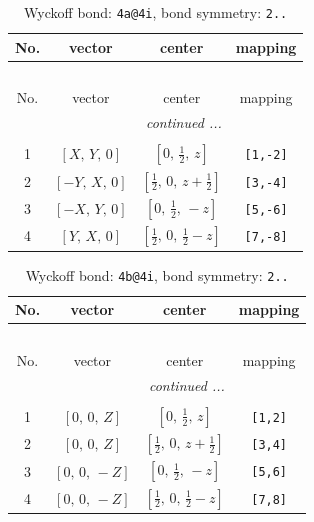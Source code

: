 \documentclass[fleqn,8pt]{jsarticle}
\begin{document}
\begin{longtable}{cccc}
\caption{Wyckoff bond: {\tt 4a@4i}, bond symmetry: {\tt 2..}}
 \\
 \hline \hline
No. & vector & center & mapping \\ \hline \endfirsthead

\multicolumn{3}{l}{\tablename\ \thetable{}} \\
 \hline \hline
No. & vector & center & mapping \\ \hline \endhead

 \hline \hline
\multicolumn{3}{r}{\footnotesize\it continued ...} \\ \endfoot

 \hline \hline
\multicolumn{3}{r}{} \\ \endlastfoot

1 & $\left[ X,\, Y,\, 0 \right]$ & $\left[ 0,\, \frac{1}{2},\, z \right]$ & {\tt [1,-2]} \\ \hline
2 & $\left[ - Y,\, X,\, 0 \right]$ & $\left[ \frac{1}{2},\, 0,\, z + \frac{1}{2} \right]$ & {\tt [3,-4]} \\ \hline
3 & $\left[ - X,\, Y,\, 0 \right]$ & $\left[ 0,\, \frac{1}{2},\, - z \right]$ & {\tt [5,-6]} \\ \hline
4 & $\left[ Y,\, X,\, 0 \right]$ & $\left[ \frac{1}{2},\, 0,\, \frac{1}{2} - z \right]$ & {\tt [7,-8]} \\
\end{longtable}
\renewcommand{\arraystretch}{1.2}
\begin{longtable}{cccc}
\caption{Wyckoff bond: {\tt 4b@4i}, bond symmetry: {\tt 2..}}
 \\
 \hline \hline
No. & vector & center & mapping \\ \hline \endfirsthead

\multicolumn{3}{l}{\tablename\ \thetable{}} \\
 \hline \hline
No. & vector & center & mapping \\ \hline \endhead

 \hline \hline
\multicolumn{3}{r}{\footnotesize\it continued ...} \\ \endfoot

 \hline \hline
\multicolumn{3}{r}{} \\ \endlastfoot

1 & $\left[ 0,\, 0,\, Z \right]$ & $\left[ 0,\, \frac{1}{2},\, z \right]$ & {\tt [1,2]} \\ \hline
2 & $\left[ 0,\, 0,\, Z \right]$ & $\left[ \frac{1}{2},\, 0,\, z + \frac{1}{2} \right]$ & {\tt [3,4]} \\ \hline
3 & $\left[ 0,\, 0,\, - Z \right]$ & $\left[ 0,\, \frac{1}{2},\, - z \right]$ & {\tt [5,6]} \\ \hline
4 & $\left[ 0,\, 0,\, - Z \right]$ & $\left[ \frac{1}{2},\, 0,\, \frac{1}{2} - z \right]$ & {\tt [7,8]} \\
\end{longtable}
\end{document}
